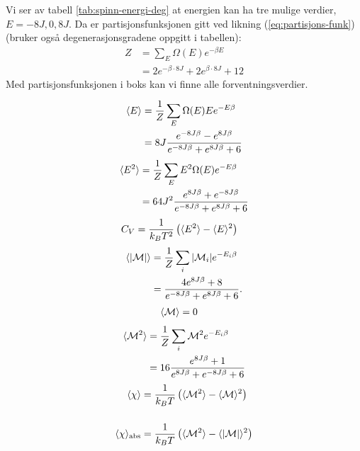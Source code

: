 \documentclass[11pt, twocolumn]{article}
\begin{document}
Vi ser av tabell \ref{tab:spinn-energi-deg} at energien kan ha tre
mulige verdier, $E = -8J,0,8J$. Da er partisjonsfunksjonen gitt ved
likning (\ref{eq:partisjons-funk}) (bruker også degenerasjonsgradene
oppgitt i tabellen):
\begin{align}
  Z &= \sum_E \Omega(E)e^{-\beta E}\\ &= 2e^{-\beta \cdot 8J} + 2e^{\beta
  \cdot 8J} + 12\label{eq:partisjons-funk-2x2}
\end{align}
Med partisjonsfunksjonen i boks kan vi finne alle forventningsverdier.

\begin{align}
\begin{split}
  \langle E \rangle &= \frac{ 1 }{ Z }\sum_E \Omega(E) E e^{-E\beta}\\
           &= 8J \frac{ e^{-8J\beta}  - e^{8J\beta}}{ e^{-8J\beta}
             + e^{8J\beta} + 6}\label{eq:mean-E-2x2}
\end{split}
\end{align}
\begin{align}
\begin{split}
  \langle E^2 \rangle &= \frac{ 1 }{ Z }\sum_E E^2\Omega(E)e^{-E\beta}\\
  &= 64J^2 \frac{ e^{8J\beta} + e^{-8J\beta} }{ e^{-8J\beta} +
    e^{8J\beta} + 6 }\label{eq:mean-E2-2x2}
\end{split}
\end{align}
\begin{align}
  C_V &= \frac{ 1}{k_BT^2} \left( \langle E^2 \rangle - \langle E \rangle^2
        \right)\label{eq:mean-C-2x2}
\end{align}
\begin{align}
\begin{split}
  \langle |\mathcal{M}| \rangle &= \frac{ 1 }{ Z }\sum_i |\mathcal{M}_i| e^{-E_i\beta}\\
  &= \frac{ 4e^{8J\beta} + 8  }{ e^{-8J\beta} + e^{8J\beta} + 6 }.\label{eq:mean-abs-M-2x2}
\end{split}
\end{align}
\begin{align}
\langle \mathcal{M} \rangle &= 0\label{eq:mean-M-2x2}
\end{align}
\begin{align}
\begin{split}
  \langle \mathcal{M}^2 \rangle &= \frac{ 1 }{ Z } \sum_i \mathcal{M}^2
  e^{-E_i\beta}\\
  &= 16 \frac{ e^{8J\beta} + 1 }{ e^{8J\beta} + e^{-8J\beta}+6 }\label{eq:mean-M2-2x2}
\end{split}
\end{align}
\begin{align}
\langle \chi \rangle &= \frac{ 1 }{ k_B T} \left(
              \langle \mathcal{M}^2 \rangle-\langle \mathcal{M} \rangle^2
              \right)\label{eq:mean-chi-2x2}\\[0.5cm]
\langle \chi \rangle_\text{abs} &= \frac{ 1 }{ k_B T} \left( \langle \mathcal{M}^2 \rangle-\langle \mathcal{|M|} \rangle^2 \right)\label{eq:mean-chi-2x2-abs}
\end{align}
\end{document}
